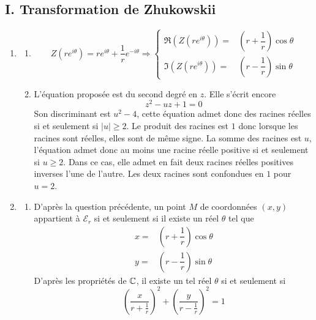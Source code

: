 \subsection*{I. Transformation de Zhukowskii}
\begin{enumerate}
 \item \begin{enumerate}
 \item 
\begin{displaymath}
 Z(re^{i\theta}) = re^{i\theta} + \dfrac{1}{r}e^{-i\theta}
\Rightarrow
\left\lbrace 
\begin{aligned}
 \Re(Z(re^{i\theta})) =& (r+\dfrac{1}{r})\cos \theta \\
 \Im(Z(re^{i\theta})) =& (r-\dfrac{1}{r})\sin \theta 
\end{aligned}
\right. 
\end{displaymath}
\item L'équation proposée est du second degré en $z$. Elle s'écrit encore
\begin{displaymath}
 z^2 -uz +1=0
\end{displaymath}
Son discriminant est $u^2-4$, cette équation admet donc des racines réelles si et seulement si $|u|\geq 2$. Le produit des racines est $1$ donc lorsque les racines sont réelles, elles sont de même signe. La somme des racines est $u$, l'équation admet donc au moins une racine réelle positive si et seulement si $u\geq 2$.\newline
Dans ce cas, elle admet en fait deux racines réelles positives inverses l'une de l'autre. Les deux racines sont confondues en $1$ pour $u=2$.
\end{enumerate}

\item 
\begin{enumerate}
 \item D'après la question précédente, un point $M$ de coordonnées $(x,y)$ appartient à $\mathcal E_r$ si et seulement si il existe un réel $\theta$ tel que
\begin{align*}
 x =& (r+\dfrac{1}{r})\cos \theta \\
 y =& (r-\dfrac{1}{r})\sin \theta 
\end{align*}
D'après les propriétés de $\mathbb{C}$, il existe un tel réel $\theta$ si et seulement si
\begin{displaymath}
 \left( \dfrac{x}{r+\frac{1}{r}}\right)^2 + \left( \dfrac{y}{r-\frac{1}{r}}\right)^2=1
\end{displaymath}


\end{enumerate}
\end{enumerate}
